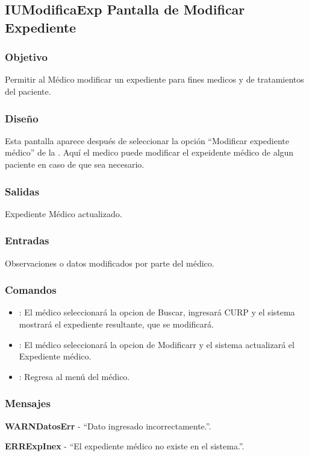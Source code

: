 \subsection{IUModificaExp Pantalla de Modificar Expediente}

\subsubsection{Objetivo}
	Permitir al M\'edico modificar un expediente para fines medicos y de tratamientos del paciente.

\subsubsection{Diseño}
	Esta pantalla aparece despu\'es de seleccionar la opci\'on "`Modificar expediente m\'edico"' de la \label{IUMedico}. Aqu\'i el medico puede modificar el expeidente m\'edico de algun paciente en caso de que sea necesario.


\subsubsection{Salidas}

	Expediente M\'edico actualizado.

\subsubsection{Entradas}
Observaciones o datos modificados por parte del m\'edico.

\subsubsection{Comandos}
\begin{itemize}
		\item {}: El m\'edico seleccionar\'a la opcion de Buscar, ingresar\'a CURP y el sistema mostrar\'a el expediente resultante, que se modificar\'a.
		\item {}: El m\'edico seleccionar\'a la opcion de Modificarr y el sistema actualizar\'a el Expediente m\'edico.
		\item {}: Regresa al men\'u del m\'edico.
\end{itemize}

\subsubsection{Mensajes}
	\begin{Citemize}
		\item {\bf WARNDatosErr} - "`Dato ingresado incorrectamente."'.
		\item {\bf ERRExpInex} - "`El expediente m\'edico no existe en el sistema."'.
	\end{Citemize}